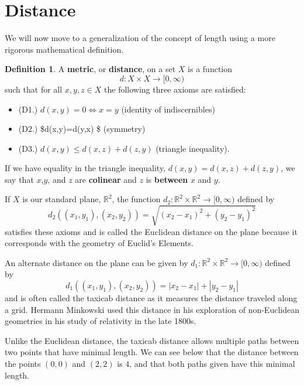 \documentclass[
]{book}
\providecommand{\tightlist}{%
  \setlength{\itemsep}{0pt}\setlength{\parskip}{0pt}}
\let\stdsection\section
\renewcommand\section{\newpage\stdsection}
\theoremstyle{definition}
\newtheorem{definition}{Definition}[chapter]
\theoremstyle{definition}
\theoremstyle{definition}
\theoremstyle{definition}
\theoremstyle{remark}
\begin{document}
\hypertarget{distance}{%
\section{Distance}\label{distance}}

We will now move to a generalization of the concept of length using a more rigorous mathematical definition.

\begin{definition}
A \textbf{metric}, or \textbf{distance}, on a set \(X\) is a function
\[d: X\times X \rightarrow [0,\infty)\] such that for all \(x,y,z\in X\) the following three axioms are satisfied:

\begin{itemize}
\tightlist
\item
  (D1.) \(d(x,y)=0 \Leftrightarrow x=y\) (identity of indiscernibles)
\item
  (D2.) \$d(x,y)=d(y,x) \$ (symmetry)
\item
  (D3.) \(d(x,y) \leq d(x,z)+d(z,y)\) (triangle inequality).
\end{itemize}

If we have equality in the triangle inequality, \(d(x,y)=d(x,z)+d(z,y)\), we say that \(x\),\(y\), and \(z\) are \textbf{colinear} and \(z\) is \textbf{between} \(x\) and \(y\).
\end{definition}

If \(X\) is our standard plane, \(\mathbb{R}^2\), the function \(d_2:\mathbb{R}^2\times \mathbb{R}^2 \rightarrow [0,\infty)\) defined by
\[d_2\left( (x_1,y_1), (x_2,y_2)\right) = \sqrt{ (x_2-x_1)^2 + (y_2-y_1)^2}\] satisfies these axioms and is called the Euclidean distance on the plane because it corresponds with the geometry of Euclid's Elements.

An alternate distance on the plane can be given by \(d_1:\mathbb{R}^2 \times \mathbb{R}^2 \rightarrow [0,\infty)\) defined by \[d_1\left( (x_1,y_1), (x_2,y_2)\right) = |x_2-x_1| + |y_2-y_1|\] and is often called the taxicab distance as it measures the distance traveled along a grid. Hermann Minkowski used this distance in his exploration of non-Euclidean geometries in his study of relativity in the late 1800s.

Unlike the Euclidean distance, the taxicab distance allows multiple paths between two points that have minimal length. We can see below that the distance between the points \((0,0)\) and \((2,2)\) is \(4\), and that both paths given have this minimal length.
\end{document}

